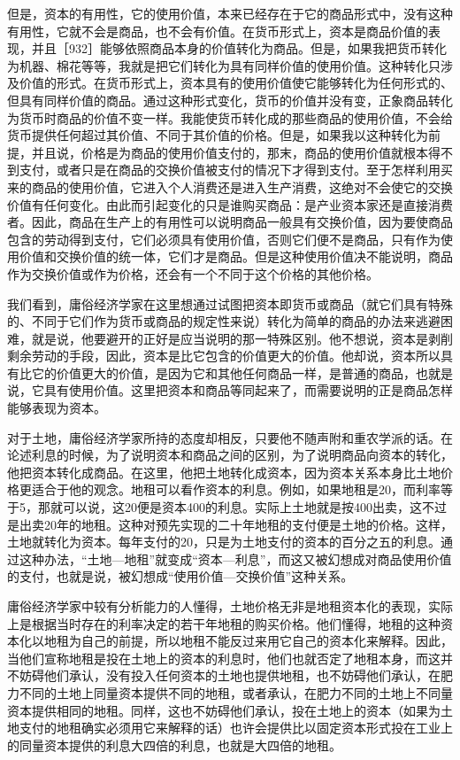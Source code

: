 但是，资本的有用性，它的使用价值，本来已经存在于它的商品形式中，没有这种有用性，它就不会是商品，也不会有价值。在货币形式上，资本是商品价值的表现，并且［932］能够依照商品本身的价值转化为商品。但是，如果我把货币转化为机器、棉花等等，我就是把它们转化为具有同样价值的使用价值。这种转化只涉及价值的形式。在货币形式上，资本具有的使用价值使它能够转化为任何形式的、但具有同样价值的商品。通过这种形式变化，货币的价值并没有变，正象商品转化为货币时商品的价值不变一样。我能使货币转化成的那些商品的使用价值，不会给货币提供任何超过其价值、不同于其价值的价格。但是，如果我以这种转化为前提，并且说，价格是为商品的使用价值支付的，那末，商品的使用价值就根本得不到支付，或者只是在商品的交换价值被支付的情况下才得到支付。至于怎样利用买来的商品的使用价值，它进入个人消费还是进入生产消费，这绝对不会使它的交换价值有任何变化。由此而引起变化的只是谁购买商品：是产业资本家还是直接消费者。因此，商品在生产上的有用性可以说明商品一般具有交换价值，因为要使商品包含的劳动得到支付，它们必须具有使用价值，否则它们便不是商品，只有作为使用价值和交换价值的统一体，它们才是商品。但是这种使用价值决不能说明，商品作为交换价值或作为价格，还会有一个不同于这个价格的其他价格。

我们看到，庸俗经济学家在这里想通过试图把资本即货币或商品（就它们具有特殊的、不同于它们作为货币或商品的规定性来说）转化为简单的商品的办法来逃避困难，就是说，他要避开的正好是应当说明的那一特殊区别。他不想说，资本是剥削剩余劳动的手段，因此，资本是比它包含的价值更大的价值。他却说，资本所以具有比它的价值更大的价值，是因为它和其他任何商品一样，是普通的商品，也就是说，它具有使用价值。这里把资本和商品等同起来了，而需要说明的正是商品怎样能够表现为资本。

对于土地，庸俗经济学家所持的态度却相反，只要他不随声附和重农学派的话。在论述利息的时候，为了说明资本和商品之间的区别，为了说明商品向资本的转化，他把资本转化成商品。在这里，他把土地转化成资本，因为资本关系本身比土地价格更适合于他的观念。地租可以看作资本的利息。例如，如果地租是20，而利率等于5，那就可以说，这20便是资本400的利息。实际上土地就是按400出卖，这不过是出卖20年的地租。这种对预先实现的二十年地租的支付便是土地的价格。这样，土地就转化为资本。每年支付的20，只是为土地支付的资本的百分之五的利息。通过这种办法，“土地—地租”就变成“资本—利息”，而这又被幻想成对商品使用价值的支付，也就是说，被幻想成“使用价值—交换价值”这种关系。

庸俗经济学家中较有分析能力的人懂得，土地价格无非是地租资本化的表现，实际上是根据当时存在的利率决定的若干年地租的购买价格。他们懂得，地租的这种资本化以地租为自己的前提，所以地租不能反过来用它自己的资本化来解释。因此，当他们宣称地租是投在土地上的资本的利息时，他们也就否定了地租本身，而这并不妨碍他们承认，没有投入任何资本的土地也提供地租，也不妨碍他们承认，在肥力不同的土地上同量资本提供不同的地租，或者承认，在肥力不同的土地上不同量资本提供相同的地租。同样，这也不妨碍他们承认，投在土地上的资本（如果为土地支付的地租确实必须用它来解释的话）也许会提供比以固定资本形式投在工业上的同量资本提供的利息大四倍的利息，也就是大四倍的地租。

